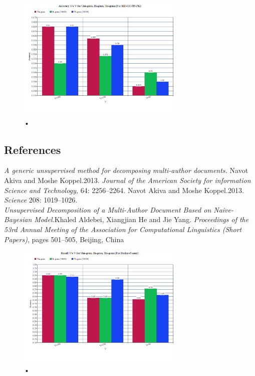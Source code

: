 \documentclass[letterpaper]{article}
\begin{document}
\begin{figure}
\caption{•}
\includegraphics[width=8cm]{6.png}
\end{figure}

\subsection{References} 
\textit{A generic unsupervised method for decomposing multi-author documents.} Navot Akiva and Moshe Koppel.2013. \textit{Journal of the American Society for information Science and Technology,} 64: 2256--2264.
Navot Akiva and Moshe Koppel.2013. \textit{Science} 208: 1019--1026.\\
\textit{Unsupervised Decomposition of a Multi-Author Document Based on Naive-Bayesian Model.}Khaled Aldebei, Xiangjian He and Jie Yang. \textit{Proceedings of the 53rd Annual Meeting of the Association for Computational Linguistics (Short Papers)}, pages 501–505, Beijing, China
\begin{figure}[H]
\caption{•}
\includegraphics[width=8cm]{1.png}
\end{figure}
\end{document}
